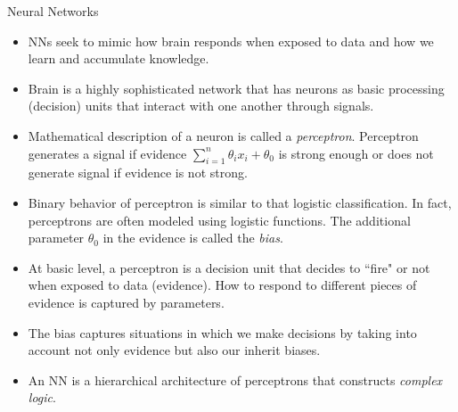 \documentclass[9pt]{beamer}
\begin{document}
\begin{frame}{Neural Networks}

\begin{itemize}
\item NNs seek to mimic how  brain responds when exposed to data and how we learn and accumulate knowledge. 

\item Brain is a highly sophisticated network that has neurons as basic processing (decision) units that interact with one another through signals. 

\item  Mathematical description of a neuron is called a {\em perceptron}. Perceptron generates a signal if evidence $\sum_{i=1}^n\theta_ix_i+\theta_0$ is strong enough or does not generate signal if evidence is not strong. 

\item Binary behavior of perceptron is similar to that logistic classification. In fact, perceptrons are often modeled using logistic functions. The additional parameter $\theta_0$ in the evidence is called the {\em bias}. 

\item At basic level, a perceptron is a decision unit that decides to ``fire" or not when exposed to data (evidence). How to respond to different pieces of evidence is captured by parameters.   

\item The bias captures situations in which we make decisions by taking into account not only evidence but also our inherit biases. 
 
\item An NN is a hierarchical architecture of perceptrons that constructs {\em complex logic}. 
\end{itemize}

\end{frame}

\end{document}
